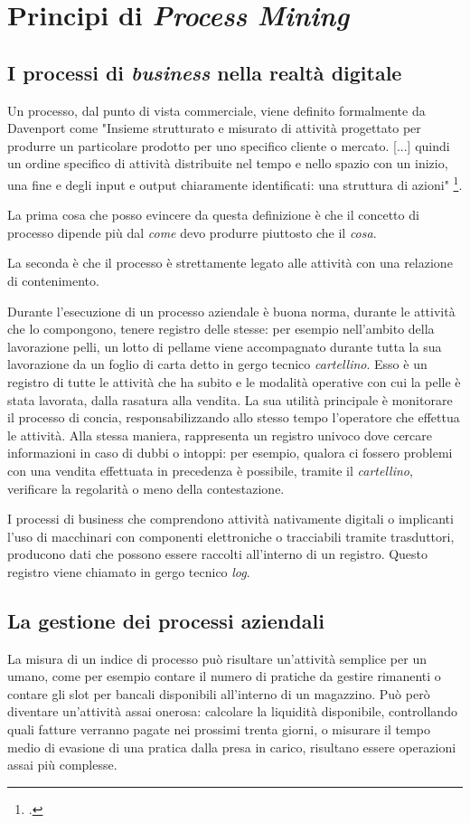 \section{Principi di \textit{Process Mining}}
\subsection{I processi di \textit{business} nella realtà digitale}
Un processo, dal punto di vista commerciale, viene definito formalmente da Davenport come "Insieme strutturato e misurato di attività progettato per produrre un particolare prodotto per uno specifico cliente o mercato. [...] quindi un ordine specifico di attività distribuite nel tempo e nello spazio con un inizio, una fine e degli input e output chiaramente identificati: una struttura di azioni" \footcite{davenport:ProcessInnovation}.

La prima cosa che posso evincere da questa definizione è che il concetto di processo dipende più dal \emph{come} devo produrre piuttosto che il \emph{cosa}.

La seconda è che il processo è strettamente legato alle attività con una relazione di contenimento.

Durante l'esecuzione di un processo aziendale è buona norma, durante le attività che lo compongono, tenere registro delle stesse: per esempio nell'ambito della lavorazione pelli, un lotto di pellame viene accompagnato durante tutta la sua lavorazione da un foglio di carta detto in gergo tecnico \emph{cartellino}. Esso è un registro di tutte le attività che ha subito e le modalità operative con cui la pelle è stata lavorata, dalla rasatura alla vendita. La sua utilità principale è monitorare il processo di concia, responsabilizzando allo stesso tempo l'operatore che effettua le attività. Alla stessa maniera, rappresenta un registro univoco dove cercare informazioni in caso di dubbi o intoppi: per esempio, qualora ci fossero problemi con una vendita effettuata in precedenza è possibile, tramite il \emph{cartellino}, verificare la regolarità o meno della contestazione.

I processi di business che comprendono attività nativamente digitali o implicanti l'uso di macchinari con componenti elettroniche o tracciabili tramite trasduttori, producono dati che possono essere raccolti all'interno di un registro. Questo registro viene chiamato in gergo tecnico \textit{log}.


\subsection{La gestione dei processi aziendali}
La misura di un indice di processo può risultare un'attività semplice per un umano, come per esempio contare il numero di pratiche da gestire rimanenti o contare gli slot per bancali disponibili all'interno di un magazzino. Può però diventare un'attività assai onerosa: calcolare la liquidità disponibile, controllando quali fatture verranno pagate nei prossimi trenta giorni, o misurare il tempo medio di evasione di una pratica dalla presa in carico, risultano essere operazioni assai più complesse.

